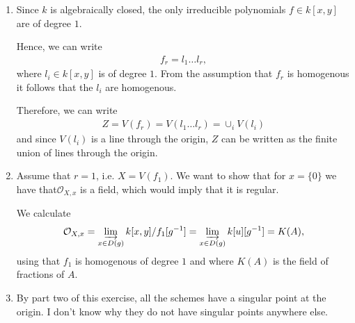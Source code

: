 \newcommand{\sheet}{11}




\maketitle{}

\begin{exercise}{3}
    \begin{enumerate}
        \item Since $k$ is algebraically closed, the only irreducible polynomials $f\in k[x,y]$ are of degree $1$.
        
        Hence, we can write 
        \begin{align*}
            f_r=l_1  \dots  l_r,
        \end{align*}
        where $l_i\in k[x,y]$ is of degree $1$. From the assumption that $f_r$ is homogenous it follows that the $l_i$ are homogenous.

        Therefore, we can write
        \begin{align*}
            Z=V(f_r)=V(l_1 \dots  l_r)=\cup_i V(l_i)
        \end{align*}
        and since $V(l_i)$ is a line through the origin, $Z$ can be written as the finite union of lines through the origin.

        \item Assume that $r=1$, i.e. $X=V(f_1).$
        We want to show that for $x=\lbrace 0 \rbrace$ we have that$\mathcal{O}_{X,x}$ is a field, which would imply that it is regular.

        We calculate 
        \begin{align*}
            \mathcal{O}_{X,x}=\varinjlim_{x\in D(g)} k[x,y]/f_1 [g^{-1}]=\varinjlim_{x\in D(g)} k[u] [g^{-1}]=K(A),
        \end{align*}
        using that $f_1$ is homogenous of degree $1$ and where $K(A)$ is the field of fractions of $A$.

        \item By part two of this exercise, all the schemes have a singular point at the origin. I don't know why they do not have singular
        points anywhere else.
    \end{enumerate}

\end{exercise}


